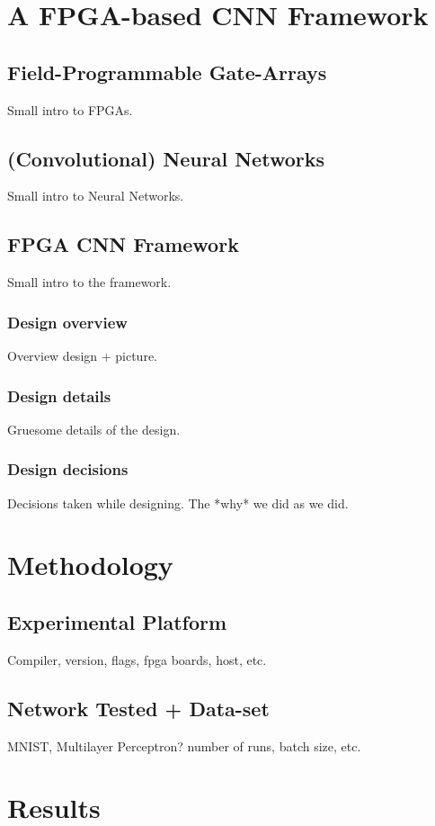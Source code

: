 \documentclass[techrep,english]{ipsj}
\begin{document}
\section{A FPGA-based CNN Framework}
\subsection{Field-Programmable Gate-Arrays}
Small intro to FPGAs.

\subsection{(Convolutional) Neural Networks}
Small intro to Neural Networks.

\subsection{FPGA CNN Framework}
Small intro to the framework.
\subsubsection{Design overview}
Overview design + picture.
\subsubsection{Design details}
Gruesome details of the design.
\subsubsection{Design decisions}
Decisions taken while designing. The *why* we did as we did.

\section{Methodology}
\subsection{Experimental Platform}
Compiler, version, flags, fpga boards, host, etc.
\subsection{Network Tested + Data-set}
MNIST, Multilayer Perceptron?
number of runs, batch size, etc.

\section{Results}
\end{document}
